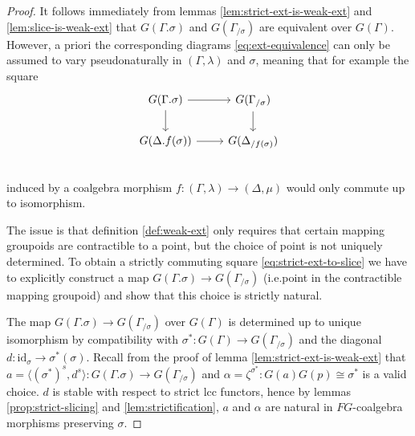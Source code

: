 \documentclass{article}
\theoremstyle{remark}
\theoremstyle{definition}
\begin{document}
\begin{proof}
  It follows immediately from lemmas \ref{lem:strict-ext-is-weak-ext} and \ref{lem:slice-is-weak-ext} that $G(\Gamma.\sigma)$ and $G(\Gamma_{/ \sigma})$ are equivalent over $G(\Gamma)$.
  However, a priori the corresponding diagrams \eqref{eq:ext-equivalence} can only be assumed to vary pseudonaturally in $(\Gamma, \lambda)$ and $\sigma$, meaning that for example the square
  \begin{equation}
    \label{eq:strict-ext-to-slice}
    \begin{tikzcd}
      G(\Gamma.\sigma) \arrow[r] \arrow[d] & G(\Gamma_{/ \sigma}) \arrow[d] \\
      G(\Delta.f(\sigma)) \arrow[r] & G(\Delta_{/ f(\sigma)}) \\
    \end{tikzcd}
  \end{equation}
  induced by a coalgebra morphism $f : (\Gamma, \lambda) \rightarrow (\Delta, \mu)$ would only commute up to isomorphism.

  The issue is that definition \ref{def:weak-ext} only requires that certain mapping groupoids are contractible to a point, but the choice of point is not uniquely determined.
  To obtain a strictly commuting square \eqref{eq:strict-ext-to-slice} we have to explicitly construct a map $G(\Gamma.\sigma) \rightarrow G(\Gamma_{/ \sigma})$ (i.e.\@ point in the contractible mapping groupoid) and show that this choice is strictly natural.

  The map $G(\Gamma.\sigma) \rightarrow G(\Gamma_{/ \sigma})$ over $G(\Gamma)$ is determined up to unique isomorphism by compatibility with $\sigma^* : G(\Gamma) \rightarrow G(\Gamma_{/ \sigma})$ and the diagonal $d : \mathrm{id}_\sigma \rightarrow \sigma^*(\sigma)$.
  Recall from the proof of lemma \ref{lem:strict-ext-is-weak-ext} that $a = \langle (\sigma^*)^s, d^s \rangle : G(\Gamma.\sigma) \rightarrow G(\Gamma_{/ \sigma})$ and $\alpha = \zeta^{\sigma^*} : G(a) G(p) \cong \sigma^*$ is a valid choice.
  $d$ is stable with respect to strict lcc functors, hence by lemmas \ref{prop:strict-slicing} and \ref{lem:strictification}, $a$ and $\alpha$ are natural in $FG$-coalgebra morphisms preserving $\sigma$.


\end{proof}
\end{document}
